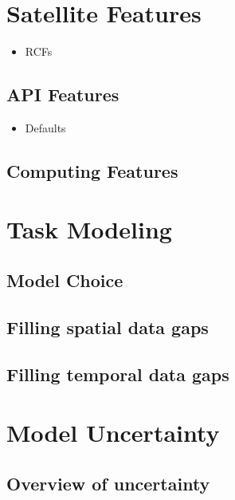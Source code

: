 \documentclass[
  letterpaper,
  DIV=11,
  numbers=noendperiod]{scrreprt}
\providecommand{\tightlist}{%
  \setlength{\itemsep}{0pt}\setlength{\parskip}{0pt}}\usepackage{longtable,booktabs,array}
\begin{document}
\part{Satellite Features}

\begin{itemize}
\tightlist
\item
  RCFs
\end{itemize}

\hypertarget{api-features}{%
\chapter{API Features}\label{api-features}}

\begin{itemize}
\tightlist
\item
  Defaults
\end{itemize}

\hypertarget{computing-features}{%
\chapter{Computing Features}\label{computing-features}}

\part{Task Modeling}

\hypertarget{model-choice}{%
\chapter{Model Choice}\label{model-choice}}

\hypertarget{filling-spatial-data-gaps}{%
\chapter{Filling spatial data gaps}\label{filling-spatial-data-gaps}}

\hypertarget{filling-temporal-data-gaps}{%
\chapter{Filling temporal data gaps}\label{filling-temporal-data-gaps}}

\part{Model Uncertainty}

\hypertarget{overview-of-uncertainty}{%
\chapter{Overview of uncertainty}\label{overview-of-uncertainty}}
\end{document}
